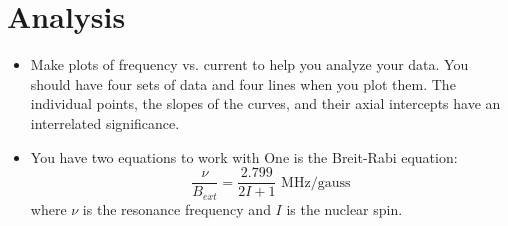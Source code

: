 \documentclass[11pt]{article}
\begin{document}
\section{Analysis}
\begin{itemize}
\item Make plots of frequency vs. current to help you analyze your data. You should have four sets of data and four lines when you plot them. The individual points, the slopes of the curves, and their axial intercepts have an interrelated significance.

\item You have two equations to work with One is the Breit-Rabi equation:
\begin{equation}
\frac{\nu}{B_{ext}}=\frac{2.799}{2I+1}\textrm{ MHz/gauss}
\label{eqn:br}
\end{equation}
where $\nu$ is the resonance frequency and $I$ is the nuclear spin.


\end{itemize}
\end{document}
